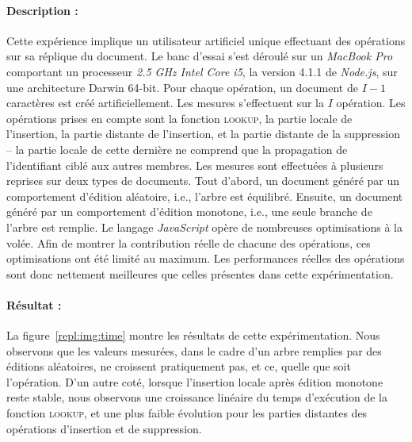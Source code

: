\paragraph{Description :} Cette expérience implique un utilisateur artificiel
unique effectuant des opérations sur sa réplique du document. Le banc d'essai
s'est déroulé sur un \emph{MacBook Pro} comportant un processeur \emph{2.5 GHz
  Intel Core i5}, la version 4.1.1 de \emph{Node.js}, sur une architecture
Darwin 64-bit. Pour chaque opération, un document de $I-1$ caractères est créé
artificiellement. Les mesures s'effectuent sur la $I$ opération. Les
opérations prises en compte sont la fonction \textsc{lookup}, la partie locale
de l'insertion, la partie distante de l'insertion, et la partie distante de la
suppression -- la partie locale de cette dernière ne comprend que la propagation
de l'identifiant ciblé aux autres membres. Les mesures sont effectuées à
plusieurs reprises sur deux types de documents. Tout d'abord, un document généré
par un comportement d'édition aléatoire, i.e., l'arbre \LSEQ est
équilibré. Ensuite, un document généré par un comportement d'édition monotone,
i.e., une seule branche de l'arbre \LSEQ est remplie. 
Le langage \emph{JavaScript} opère de nombreuses optimisations à la volée. Afin
de montrer la contribution réelle de chacune des opérations, ces optimisations
ont été limité au maximum. Les performances réelles des opérations sont donc
nettement meilleures que celles présentes dans cette expérimentation.

\paragraph{Résultat :} La figure~\ref{repl:img:time} montre les résultats de
cette expérimentation. Nous observons que les valeurs mesurées, dans le cadre
d'un arbre remplies par des éditions aléatoires, ne croissent pratiquement pas,
et ce, quelle que soit l'opération. D'un autre coté, lorsque l'insertion locale
après édition monotone reste stable, nous observons une croissance linéaire du
temps d'exécution de la fonction \textsc{lookup}, et une plus faible évolution
pour les parties distantes des opérations d'insertion et de suppression.

